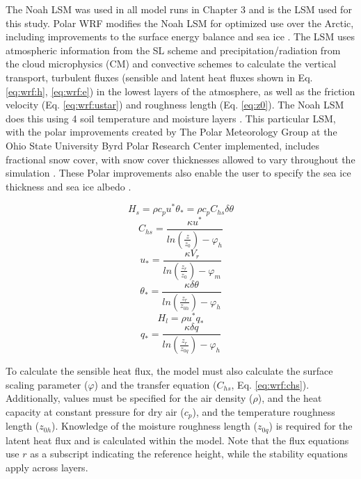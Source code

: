 The Noah LSM \citep{chen:2001} was used in all model runs in Chapter 3 and is the LSM used for this study. Polar WRF modifies the Noah LSM for optimized use over the Arctic, including improvements to the surface energy balance and sea ice \citep{hines:2015, bromwich:2009}. The LSM uses atmospheric information from the SL scheme and precipitation/radiation from the cloud microphysics (CM) and convective schemes to calculate the vertical transport, turbulent fluxes (sensible and latent heat fluxes shown in Eq. \ref{eq:wrf:h}, \ref{eq:wrf:e}) in the lowest layers of the atmosphere, as well as the friction velocity (Eq. \ref{eq:wrf:ustar}) and roughness length (Eq. \ref{eq:z0}). The Noah LSM does this using 4 soil temperature and moisture layers \citep{dudhia:2014, skamarock:2019}. This particular LSM, with the polar improvements created by The Polar Meteorology Group at the Ohio State University Byrd Polar Research Center implemented, includes fractional snow cover, with snow cover thicknesses allowed to vary throughout the simulation \cite{chen:2001}. These Polar improvements also enable the user to specify the sea ice thickness and sea ice albedo \citep{hines:2015}.

\begin{equation}\label{eq:wrf:h}
H_{s} = \rho c_{p} u^{*} \theta_{*} = \rho c_{p} C_{hs} \delta \theta
\end{equation}
\begin{equation}\label{eq:wrf:chs}
C_{hs} = \frac{\kappa u^{*}}{ln (\frac{z}{z_{0}}) - \varphi_{h}}
\end{equation}
\begin{equation}\label{eq:wrf:ustar}
u_{*} = \frac{\kappa V_{r}}{ln(\frac{z_{r}}{z_{0}}) - \varphi_{m}}
\end{equation}
\begin{equation}\label{eq:wrf:thetastar}
\theta_{*} = \frac{\kappa \delta \theta}{ln(\frac{z_{r}}{z_{0h}}) - \varphi_{h}} 
\end{equation}
\begin{equation}\label{eq:wrf:e}
H_{l} = \rho u^{*} q_{*}
\end{equation}
\begin{equation}\label{eq:wrf:q*}
q_{*} = \frac{\kappa \delta q}{ln(\frac{z_{r}}{z_{0q}}) - \varphi_{h}}
\end{equation}

To calculate the sensible heat flux, the model must also calculate the surface scaling parameter ($\varphi$) and the transfer equation ($C_{hs}$, Eq. \ref{eq:wrf:chs}). Additionally, values must be specified for the air density ($\rho$), and the heat capacity at constant pressure for dry air ($c_{p}$), and the temperature roughness length ($z_{0h}$). Knowledge of the moisture roughness length ($z_{0q}$) is required for the latent heat flux and is calculated within the model. Note that the flux equations use $r$ as a subscript indicating the reference height, while the stability equations apply across layers.

